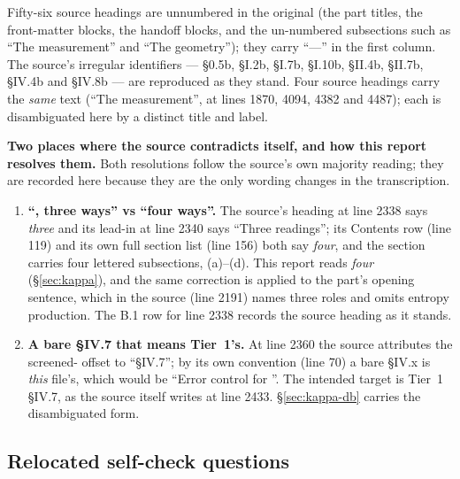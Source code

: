 \begin{aside}
Fifty-six source headings are unnumbered in the original (the part titles, the
front-matter blocks, the handoff blocks, and the un-numbered subsections such as
``The measurement'' and ``The geometry''); they carry ``---'' in the first
column. The source's
irregular identifiers --- \S0.5b, \S I.2b, \S I.7b, \S I.10b, \S II.4b,
\S II.7b, \S IV.4b and \S IV.8b --- are reproduced as they stand. Four source
headings carry the \emph{same} text (``The measurement'', at lines 1870, 4094,
4382 and 4487); each is disambiguated here by a distinct title and label.
\end{aside}

\begin{aside}
\textbf{Two places where the source contradicts itself, and how this report
resolves them.} Both resolutions follow the source's own majority reading; they
are recorded here because they are the only wording changes in the
transcription.

\begin{enumerate}
\item \textbf{``\kap, three ways'' vs ``four ways''.} The source's heading at
  line 2338 says \emph{three} and its lead-in at line 2340 says ``Three
  readings''; its Contents row (line 119) and its own full section list (line
  156) both say \emph{four}, and the section carries four lettered subsections,
  (a)--(d). This report reads \emph{four} (\S\ref{sec:kappa}), and the same
  correction is applied to the part's opening sentence, which in the source
  (line 2191) names three roles and omits entropy production. The B.1 row for
  line 2338 records the source heading as it stands.
\item \textbf{A bare \S IV.7 that means Tier~1's.} At line 2360 the source
  attributes the screened-\kap{} offset to ``\S IV.7''; by its own convention
  (line 70) a bare \S IV.x is \emph{this} file's, which would be ``Error control
  for \Phifl''. The intended target is Tier~1 \S IV.7, as the source itself
  writes at line 2433. \S\ref{sec:kappa-db} carries the disambiguated form.
\end{enumerate}
\end{aside}

\subsection{Relocated self-check questions}
\label{app:selfcheck}

